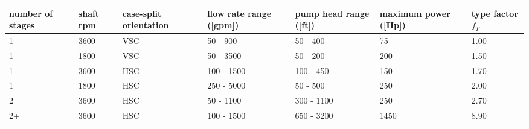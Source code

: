 \begin{tabular}{C{0.1\textwidth}C{0.12\textwidth}C{0.12\textwidth}C{0.12\textwidth}C{0.12\textwidth}C{0.12\textwidth}C{0.12\textwidth}}
	number of stages & shaft rpm & case-split orientation & flow rate range ([gpm]) & pump head range ([ft]) & maximum power ([Hp]) & type factor $f_T$ \\  & 3600 & VSC & 50 - 900 & 50 - 400 & 75 & 1.00 \\
	1 & 1800 & VSC & 50 - 3500 & 50 - 200 & 200 & 1.50 \\
	1 & 3600 & HSC & 100 - 1500 & 100 - 450 & 150 & 1.70 \\
	1 & 1800 & HSC & 250 - 5000 & 50 - 500 & 250 & 2.00 \\
	2 & 3600 & HSC & 50 - 1100 & 300 - 1100 & 250 & 2.70 \\
	2+ & 3600 & HSC & 100 - 1500 & 650 - 3200 & 1450 & 8.90 \\ \hline 
\end{tabular}